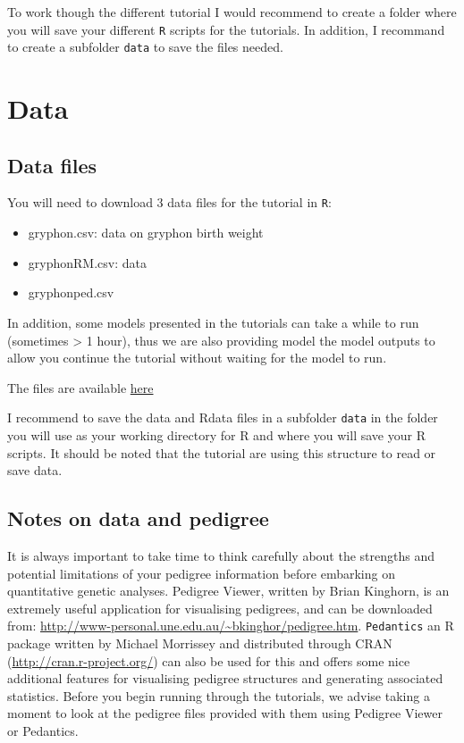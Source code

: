 \documentclass[12pt,]{book}
\providecommand{\tightlist}{%
  \setlength{\itemsep}{0pt}\setlength{\parskip}{0pt}}
\begin{document}
To work though the different tutorial I would recommend to create a folder where you will save your different \texttt{R} scripts for the tutorials. In addition, I recommand to create a subfolder \texttt{data} to save the files needed.

\hypertarget{data}{%
\section{Data}\label{data}}

\hypertarget{data-files}{%
\subsection{Data files}\label{data-files}}

You will need to download 3 data files for the tutorial in \texttt{R}:

\begin{itemize}
\tightlist
\item
  gryphon.csv: data on gryphon birth weight
\item
  gryphonRM.csv: data
\item
  gryphonped.csv
\end{itemize}

In addition, some models presented in the tutorials can take a while to run (sometimes \textgreater{} 1 hour), thus we are also providing model the model outputs to allow you continue the tutorial without waiting for the model to run.

The files are available \href{https://github.com/JulienGAMartin/wam_tuto/tree/master/data}{here}

I recommend to save the data and Rdata files in a subfolder \texttt{data} in the folder you will use as your working directory for R and where you will save your R scripts. It should be noted that the tutorial are using this structure to read or save data.

\hypertarget{notes-on-data-and-pedigree}{%
\subsection{Notes on data and pedigree}\label{notes-on-data-and-pedigree}}

It is always important to take time to think carefully about the strengths and potential limitations of your pedigree information before embarking on quantitative genetic analyses. Pedigree Viewer, written by Brian Kinghorn, is an extremely useful application for visualising pedigrees, and can be downloaded from: \url{http://www-personal.une.edu.au/~bkinghor/pedigree.htm}. \texttt{Pedantics} an R package written by Michael Morrissey and distributed through CRAN (\url{http://cran.r-project.org/}) can also be used for this and offers some nice additional features for visualising pedigree structures and generating associated statistics. Before you begin running through the tutorials, we advise taking a moment to look at the pedigree files provided with them using Pedigree Viewer or Pedantics.
\end{document}
